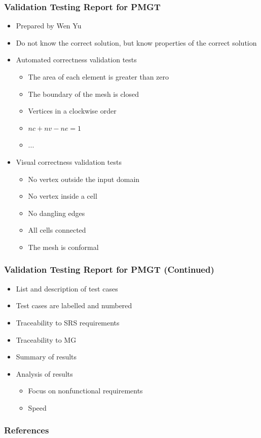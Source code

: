 \documentclass[t,12pt,numbers,fleqn]{beamer}
\begin{document}
\begin{frame}
\frametitle{Validation Testing Report for PMGT}
\begin{itemize}
\item Prepared by Wen Yu
\item Do not know the correct solution, but know properties of the correct solution
\item Automated correctness validation tests
\begin{itemize}
\item The area of each element is greater than zero
\item The boundary of the mesh is closed
\item Vertices in a clockwise order
\item $nc + nv - ne = 1$
\item ...
\end{itemize}
\item Visual correctness validation tests
\begin{itemize}
\item No vertex outside the input domain
\item No vertex inside a cell
\item No dangling edges
\item All cells connected
\item  The mesh is conformal
\end{itemize}
\end{itemize}
\end{frame}


\begin{frame}
\frametitle{Validation Testing Report for PMGT (Continued)}
\begin{itemize}
\item List and description of test cases
\item Test cases are labelled and numbered
\item Traceability to SRS requirements
\item Traceability to MG
\item Summary of results
\item Analysis of results
\begin{itemize}
\item Focus on nonfunctional requirements
\item Speed
\end{itemize}
\end{itemize}
\end{frame}


\begin{frame}[allowframebreaks]
\frametitle{References}



\end{frame}

\end{document}
